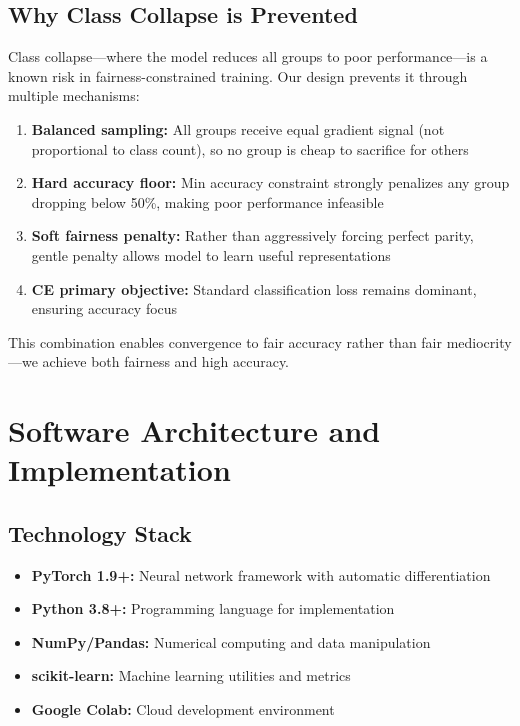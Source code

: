 \documentclass[11pt,a4paper,oneside]{report}
\begin{document}
\section{Why Class Collapse is Prevented}

Class collapse---where the model reduces all groups to poor performance---is a known risk in fairness-constrained training. Our design prevents it through multiple mechanisms:

\begin{enumerate}

\item \textbf{Balanced sampling:} All groups receive equal gradient signal (not proportional to class count), so no group is cheap to sacrifice for others

\item \textbf{Hard accuracy floor:} Min accuracy constraint strongly penalizes any group dropping below 50\%, making poor performance infeasible

\item \textbf{Soft fairness penalty:} Rather than aggressively forcing perfect parity, gentle penalty allows model to learn useful representations

\item \textbf{CE primary objective:} Standard classification loss remains dominant, ensuring accuracy focus

\end{enumerate}

This combination enables convergence to fair accuracy rather than fair mediocrity---we achieve both fairness and high accuracy.


\chapter{Software Architecture and Implementation}

\section{Technology Stack}

\begin{itemize}

\item \textbf{PyTorch 1.9+:} Neural network framework with automatic differentiation

\item \textbf{Python 3.8+:} Programming language for implementation

\item \textbf{NumPy/Pandas:} Numerical computing and data manipulation

\item \textbf{scikit-learn:} Machine learning utilities and metrics

\item \textbf{Google Colab:} Cloud development environment

\end{itemize}
\end{document}
